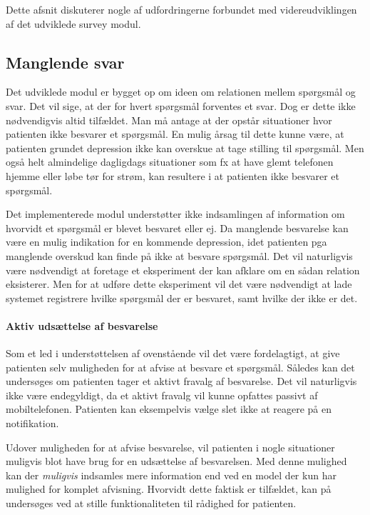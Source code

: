 Dette afsnit diskuterer nogle af udfordringerne forbundet med videreudviklingen af det udviklede survey modul.

\subsection{Manglende svar}
Det udviklede modul er bygget op om ideen om relationen mellem spørgsmål og svar.
Det vil sige, at der for hvert spørgsmål forventes et svar.
Dog er dette ikke nødvendigvis altid tilfældet.
Man må antage at der opstår situationer hvor patienten ikke besvarer et spørgsmål.
En mulig årsag til dette kunne være, at patienten grundet depression ikke kan overskue at tage stilling til spørgsmål.
Men også helt almindelige dagligdags situationer som fx at have glemt telefonen hjemme eller løbe tør for strøm, kan resultere i at patienten ikke besvarer et spørgsmål.

Det implementerede modul understøtter ikke indsamlingen af information om hvorvidt et spørgsmål er blevet besvaret eller ej.
Da manglende besvarelse kan være en mulig indikation for en kommende depression, idet patienten pga manglende overskud kan finde på ikke at besvare spørgsmål.
Det vil naturligvis være nødvendigt at foretage et eksperiment der kan afklare om en sådan relation eksisterer.
Men for at udføre dette eksperiment vil det være nødvendigt at lade systemet registrere hvilke spørgsmål der er besvaret, samt hvilke der ikke er det.

\paragraph{Aktiv udsættelse af besvarelse}
Som et led i understøttelsen af ovenstående vil det være fordelagtigt, at give patienten selv muligheden for at afvise at besvare et spørgsmål.
Således kan det undersøges om patienten tager et aktivt fravalg af besvarelse.
Det vil naturligvis ikke være endegyldigt, da et aktivt fravalg vil kunne opfattes passivt af mobiltelefonen.
Patienten kan eksempelvis vælge slet ikke at reagere på en notifikation.

Udover muligheden for at afvise besvarelse, vil patienten i nogle situationer muligvis blot have brug for en udsættelse af besvarelsen.
Med denne mulighed kan der \textit{muligvis} indsamles mere information end ved en model der kun har mulighed for komplet afvisning.
Hvorvidt dette faktisk er tilfældet, kan på undersøges ved at stille funktionaliteten til rådighed for patienten.

